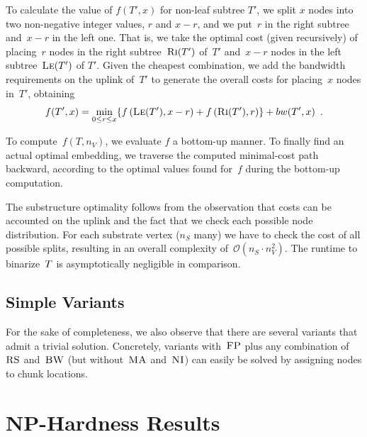 To calculate the value of $f(T', x)$ for non-leaf subtree $T'$, we split $x$ nodes
into two non-negative integer
values, $r$ and $x-r$, and we put~$r$ in the right subtree and~$x - r$ in the left one.
That is, we take the optimal cost
(given recursively) of placing~$r$ nodes in
the right subtree~$\textsc{Ri}(T')$ of~$T'$ and~$x-r$ nodes in the left subtree~$\textsc{Le}(T')$ of
$T'$. Given the cheapest combination, we add the bandwidth requirements
on the uplink of~$T'$ to generate the overall costs for placing~$x$ nodes in~$T'$, obtaining
\[
  f(T', x) = 
    \min_{0\leq r \leq x} \{  f\left(\textsc{Le}(T'),
x-r\right) +
f\left(\textsc{Ri}(T'), r\right) \} + bw(T',x)\enspace.
  \]

To compute~$f(T, n_V)$, we evaluate $f$ a bottom-up manner. 
To finally find an actual optimal embedding,
we traverse the computed minimal-cost path backward,
according to
the optimal values found for~$f$ during the bottom-up computation.


The substructure optimality follows from the observation that
costs can be accounted on the uplink and the fact
 that we check each possible node distribution.
For each substrate vertex ($n_S$ many) we have
to check the cost of all possible splits,
resulting in an overall complexity of~$\mathcal{O}(n_S \cdot n_V^2)$.
The runtime to binarize~$T$ is asymptotically negligible in comparison.


\subsection{Simple Variants}



For the sake of completeness, we also observe that there are
several variants that admit a trivial solution. Concretely, variants with~$\textsc{FP}$
plus any combination of
$\textsc{RS}$ and~$\textsc{BW}$ (but without~$\textsc{MA}$ and~$\textsc{NI}$) can easily be solved by
assigning
nodes to chunk locations.

\section{NP-Hardness Results}\label{sec:np}

